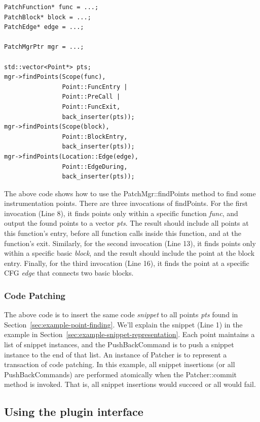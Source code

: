 \begin{lstlisting}[caption=Example of point finding]
PatchFunction* func = ...;
PatchBlock* block = ...;
PatchEdge* edge = ...;

PatchMgrPtr mgr = ...;

std::vector<Point*> pts;
mgr->findPoints(Scope(func),
                Point::FuncEntry |
                Point::PreCall |
                Point::FuncExit,
                back_inserter(pts));
mgr->findPoints(Scope(block),
                Point::BlockEntry,
                back_inserter(pts));
mgr->findPoints(Location::Edge(edge),
                Point::EdgeDuring,
                back_inserter(pts));
\end{lstlisting}
The above code shows how to use the PatchMgr::findPoints method to find some
instrumentation points. There are three invocations of findPoints. For the first
invocation (Line 8), it finds points only within a specific function
\emph{func}, and output the found points to a vector \emph{pts}. The result
should include all points at this function's entry, before all function calls
inside this function, and at the function's exit. Similarly, for the second
invocation (Line 13), it finds points only within a specific basic \emph{block},
and the result should include the point at the block entry. Finally, for the
third invocation (Line 16), it finds the point at a specific CFG \emph{edge}
that connects two basic blocks.

\subsubsection{Code Patching}



The above code is to insert the same code \emph{snippet} to all points
\emph{pts} found in Section~\ref{sec:example-point-finding}. We'll explain the snippet
(Line 1) in the example in Section~\ref{sec:example-snippet-representation}. Each point maintains
a list of snippet instances, and the PushBackCommand is to push a snippet
instance to the end of that list. An instance of Patcher is to represent a
transaction of code patching. In this example, all snippet insertions (or all
PushBackCommands) are performed atomically when the Patcher::commit method is
invoked. That is, all snippet insertions would succeed or all would fail.

\subsection{Using the plugin interface}

